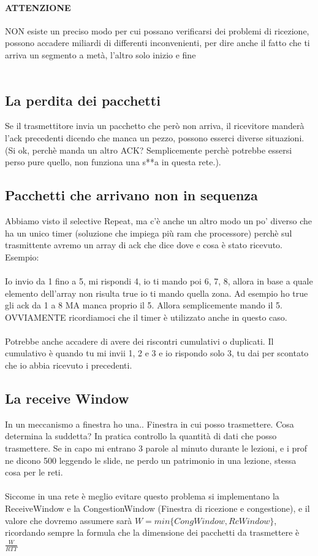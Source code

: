 \documentclass[12pt, a4paper, openany, twoside]{book}
\begin{document}
\paragraph{ATTENZIONE} NON esiste un preciso modo per cui possano verificarsi dei
problemi di ricezione, possono accadere miliardi di differenti inconvenienti, 
per dire anche il fatto che ti arriva un segmento a metà, l'altro solo inizio e 
fine
\\ \\
\subsection{La perdita dei pacchetti}
Se il trasmettitore invia un pacchetto che però non arriva, il ricevitore manderà
l'ack precedenti dicendo che manca un pezzo, possono esserci diverse situazioni.
(Si ok, perchè manda un altro ACK? Semplicemente perchè potrebbe essersi perso 
pure quello, non funziona una s**a in questa rete.).
\subsection{Pacchetti che arrivano non in sequenza}
Abbiamo visto il selective Repeat, ma c'è anche un altro modo un po' diverso che
ha un unico timer (soluzione che impiega più ram che processore) perchè sul 
trasmittente avremo un array di ack che dice dove e cosa è stato ricevuto. Esempio:
\\ \\
Io invio da 1 fino a 5, mi rispondi 4, io ti mando poi 6, 7, 8, allora in base a
quale elemento dell'array non risulta true io ti mando quella zona. Ad esempio ho 
true gli ack da 1 a 8 MA manca proprio il 5. Allora semplicemente mando il 5. 
OVVIAMENTE ricordiamoci che il timer è utilizzato anche in questo caso.
\\ \\
Potrebbe anche accadere di avere dei riscontri cumulativi o duplicati. Il cumulativo
è quando tu mi invii 1, 2 e 3 e io rispondo solo 3, tu dai per scontato che io abbia
ricevuto i precedenti.
\subsection{La receive Window}
In un meccanismo a finestra ho una.. Finestra in cui posso trasmettere. Cosa determina
la suddetta? In pratica controllo la quantità di dati che posso trasmettere. 
Se in capo mi entrano 3 parole al minuto durante le lezioni, e i prof ne dicono
500 leggendo le slide, ne perdo un patrimonio in una lezione, stessa cosa per 
le reti. \\ \\
Siccome in una rete è meglio evitare questo problema si implementano la ReceiveWindow
e la CongestionWindow (Finestra di ricezione e congestione), e il valore che 
dovremo assumere sarà $W = min\{CongWindow, RcWindow\} $, ricordando sempre la
formula che la dimensione dei pacchetti da trasmettere è $\frac{W}{RTT}$
\\ \\ 
\end{document}
